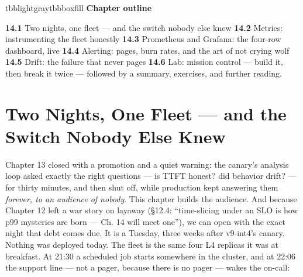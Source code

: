 \vspace{2.5pt}

\begin{calloutbox}{tbblightgray}{tbbboxfill}
{\normalsize\bfseries\color{tbbink}Chapter outline}\par\vspace{3pt}
\textbf{14.1} Two nights, one fleet — and the switch nobody else knew    \textbf{14.2} Metrics: instrumenting the fleet honestly    \textbf{14.3} Prometheus and Grafana: the four-row dashboard, live    \textbf{14.4} Alerting: pages, burn rates, and the art of not crying wolf    \textbf{14.5} Drift: the failure that never pages    \textbf{14.6} Lab: mission control — build it, then break it twice — followed by a summary, exercises, and further reading.
\end{calloutbox}

\section{Two Nights, One Fleet — and the Switch Nobody Else Knew}

Chapter 13 closed with a promotion and a quiet warning: the canary’s analysis loop asked exactly the right questions — is TTFT honest? did behavior drift? — for thirty minutes, and then shut off, while production kept answering them \textit{forever, to an audience of nobody}. This chapter builds the audience. And because Chapter 12 left a war story on layaway (§12.4: “time-slicing under an SLO is how p99 mysteries are born — Ch. 14 will meet one”), we can open with the exact night that debt comes due. It is a Tuesday, three weeks after v9-int4’s canary. Nothing was deployed today. The fleet is the same four L4 replicas it was at breakfast. At 21:30 a scheduled job starts somewhere in the cluster, and at 22:06 the support line — not a pager, because there is no pager — wakes the on-call:

